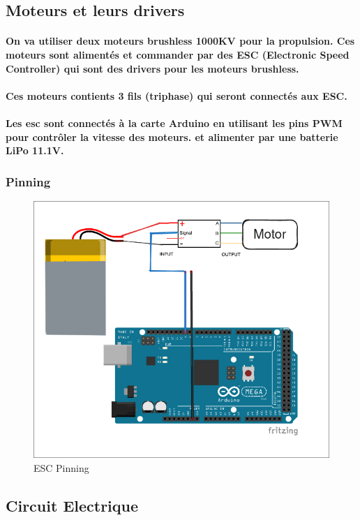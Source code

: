 \newpage

\subsection{Moteurs et leurs drivers}

\paragraph{On va utiliser deux moteurs brushless 1000KV pour la propulsion. Ces moteurs sont alimentés et commander par des ESC (Electronic Speed Controller) qui sont des drivers pour les moteurs brushless.}

\paragraph{Ces moteurs contients 3 fils (triphase) qui seront connectés aux ESC.}

\paragraph{Les \gls{esc} sont connectés à la carte Arduino en utilisant les pins PWM pour contrôler la vitesse des moteurs. et alimenter par une batterie LiPo 11.1V.}


\subsubsection{Pinning}

\begin{figure}[!htpb]
	\centering
	\includegraphics[width=0.5\linewidth]{Figures/esc-motor-pining.png}
	\caption{ESC Pinning}
	\label{fig:ESCPins}
\end{figure}

\subsection{Circuit Electrique}
